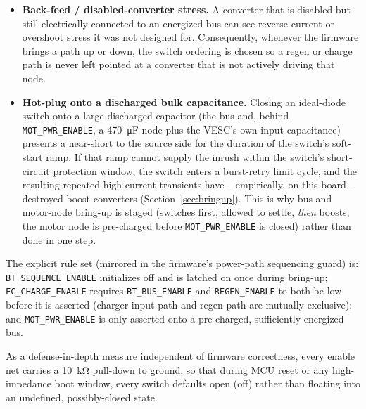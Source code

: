 \begin{itemize}
  \item \textbf{Back-feed / disabled-converter stress.} A converter that
    is disabled but still electrically connected to an energized bus can
    see reverse current or overshoot stress it was not designed for.
    Consequently, whenever the firmware brings a path up or down, the
    switch ordering is chosen so a regen or charge path is never left
    pointed at a converter that is not actively driving that node.
  \item \textbf{Hot-plug onto a discharged bulk capacitance.} Closing an
    ideal-diode switch onto a large discharged capacitor (the bus and,
    behind \texttt{MOT\_PWR\_ENABLE}, a \SI{470}{\micro\farad} node plus
    the VESC's own input capacitance) presents a near-short to the
    source side for the duration of the switch's soft-start ramp. If that
    ramp cannot supply the inrush within the switch's short-circuit
    protection window, the switch enters a burst-retry limit cycle, and
    the resulting repeated high-current transients have -- empirically,
    on this board -- destroyed boost converters (Section~\ref{sec:bringup}).
    This is why bus and motor-node bring-up is staged (switches first,
    allowed to settle, \emph{then} boosts; the motor node is pre-charged
    before \texttt{MOT\_PWR\_ENABLE} is closed) rather than done in one
    step.
\end{itemize}

The explicit rule set (mirrored in the firmware's power-path sequencing
guard) is: \texttt{BT\_SEQUENCE\_ENABLE} initializes off and is latched on
once during bring-up; \texttt{FC\_CHARGE\_ENABLE} requires
\texttt{BT\_BUS\_ENABLE} and \texttt{REGEN\_ENABLE} to both be low before
it is asserted (charger input path and regen path are mutually
exclusive); and \texttt{MOT\_PWR\_ENABLE} is only asserted onto a
pre-charged, sufficiently energized bus.

As a defense-in-depth measure independent of firmware correctness, every
enable net carries a \SI{10}{\kilo\ohm} pull-down to ground, so that
during MCU reset or any high-impedance boot window, every switch defaults
open (off) rather than floating into an undefined, possibly-closed state.


